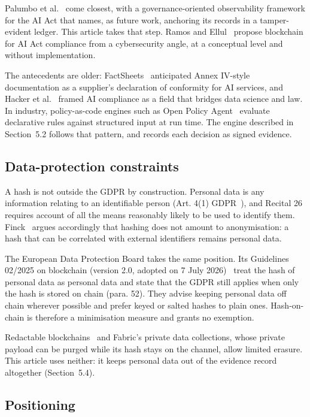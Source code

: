 Palumbo et al.~\cite{palumbo2025} come closest, with a governance-oriented observability framework for the AI Act that names, as future work, anchoring its records in a tamper-evident ledger. This article takes that step. Ramos and Ellul~\cite{ramos2024} propose blockchain for AI Act compliance from a cybersecurity angle, at a conceptual level and without implementation.

The antecedents are older: FactSheets~\cite{arnold2019} anticipated Annex IV-style documentation as a supplier's declaration of conformity for AI services, and Hacker et al.~\cite{hacker2022} framed AI compliance as a field that bridges data science and law. In industry, policy-as-code engines such as Open Policy Agent~\cite{opa} evaluate declarative rules against structured input at run time. The engine described in Section~5.2 follows that pattern, and records each decision as signed evidence.

\subsection{Data-protection constraints}

A hash is not outside the GDPR by construction. Personal data is any information relating to an identifiable person (Art. 4(1) GDPR~\cite{gdpr}), and Recital 26 requires account of all the means reasonably likely to be used to identify them. Finck~\cite{finck2018} argues accordingly that hashing does not amount to anonymisation: a hash that can be correlated with external identifiers remains personal data.

The European Data Protection Board takes the same position. Its Guidelines 02/2025 on blockchain (version 2.0, adopted on 7 July 2026)~\cite{edpb_2026} treat the hash of personal data as personal data and state that the GDPR still applies when only the hash is stored on chain (para. 52). They advise keeping personal data off chain wherever possible and prefer keyed or salted hashes to plain ones. Hash-on-chain is therefore a minimisation measure and grants no exemption.

Redactable blockchains~\cite{ateniese2017} and Fabric's private data collections, whose private payload can be purged while its hash stays on the channel, allow limited erasure. This article uses neither: it keeps personal data out of the evidence record altogether (Section~5.4).

\subsection{Positioning}

